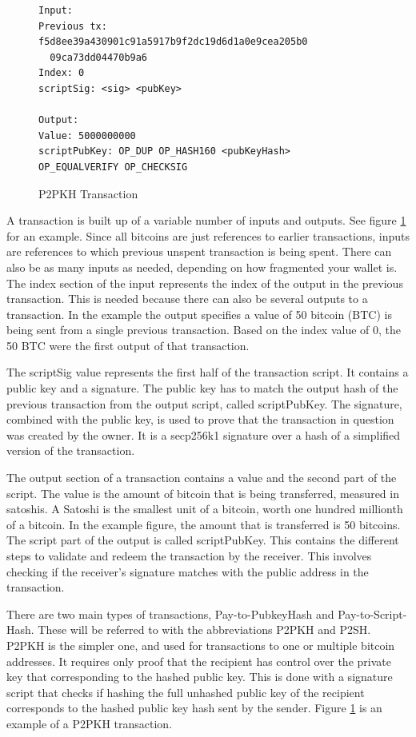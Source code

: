 \documentclass[12pt]{article}
\begin{document}
\begin{figure}[h!]
\begin{lstlisting}[numbers=none]
Input:
Previous tx: f5d8ee39a430901c91a5917b9f2dc19d6d1a0e9cea205b0
  09ca73dd04470b9a6
Index: 0
scriptSig: <sig> <pubKey>

Output:
Value: 5000000000
scriptPubKey: OP_DUP OP_HASH160 <pubKeyHash>
OP_EQUALVERIFY OP_CHECKSIG
 \end{lstlisting}
 \caption{P2PKH Transaction}
 \label{fig:transaction}
\end{figure}

A transaction is built up of a variable number of inputs and outputs. See figure \ref{fig:transaction} for an example. Since all bitcoins are just references to earlier transactions, inputs are references to which previous unspent transaction is being spent. There can also be as many inputs as needed, depending on how fragmented your wallet is. The index section of the input represents the index of the output in the previous transaction. This is needed because there can also be several outputs to a transaction. In the example the output specifies a value of 50 bitcoin (BTC) is being sent from a single previous transaction. Based on the index value of 0, the 50 BTC were the first output of that transaction. 

The scriptSig value represents the first half of the transaction script. It contains a public key and a signature. The public key has to match the output hash of the previous transaction from the output script, called scriptPubKey. The signature, combined with the public key, is used to prove that the transaction in question was created by the owner. It is a secp256k1 signature over a hash of a simplified version of the transaction. 

The output section of a transaction contains a value and the second part of the script. The value is the amount of bitcoin that is being transferred, measured in satoshis. A Satoshi is the smallest unit of a bitcoin, worth one hundred millionth of a bitcoin. In the example figure, the amount that is transferred is 50 bitcoins. The script part of the output is called scriptPubKey. This contains the different steps to validate and redeem the transaction by the receiver. This involves checking if the receiver's signature matches with the public address in the transaction. 

There are two main types of transactions, Pay-to-PubkeyHash and Pay-to-Script-Hash. These will be referred to with the abbreviations P2PKH and P2SH. P2PKH is the simpler one, and used for transactions to one or multiple bitcoin addresses. It requires only proof that the recipient has control over the private key that corresponding to the hashed public key. This is done with a signature script that checks if hashing the full unhashed public key of the recipient corresponds to the hashed public key hash sent by the sender. Figure \ref{fig:transaction} is an example of a P2PKH transaction. 
\end{document}
